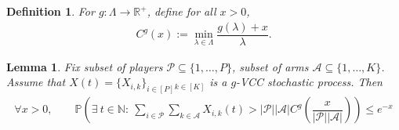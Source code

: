 \documentclass{article}
\newcommand{\R}{\mathbb{R}}
\newtheorem{definition}[theorem]{Definition}
\newtheorem{lemma}[theorem]{Lemma}
\begin{document}
\begin{definition}
    For $g:\Lambda\to\R^{+}$, define for all $x>0$,
    \begin{align*}
        C^{g}(x) := \min_{\lambda\in\Lambda} \dfrac{g(\lambda)+x}{\lambda}.
    \end{align*}
\end{definition}


\begin{lemma}
    Fix subset of players $\mathcal{P}\subseteq \{1,\ldots, P\}$, subset of arms $\mathcal{A}\subseteq \{1,\ldots, K\}$. Assume that $X(t) = \{X_{i,k}\}_{i\in[P]}\phantom{}_{k\in[K]}$ is a $g$-VCC stochastic process. Then 
    \begin{align}
    \label{eq:gvcc}
        \forall x>0, \qquad \mathbb{P}\left(\exists\ t\in \mathbb{N}:\ \sum_{i\in\mathcal{P}}\sum_{k\in \mathcal{A}}X_{i,k}(t)>|\mathcal{P}||\mathcal{A}|C^g\left(\dfrac{x}{|\mathcal{P}||\mathcal{A}|}\right)\right) \leq e^{-x}
    \end{align}
\end{lemma}
\end{document}
